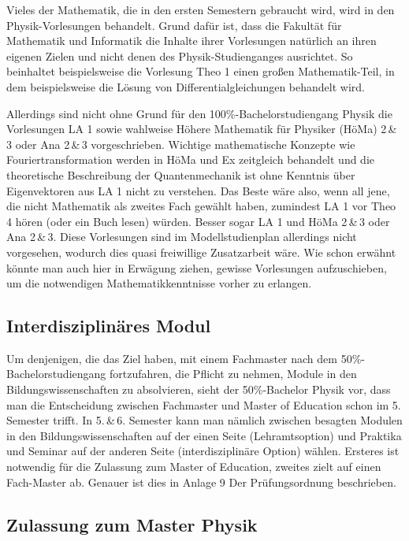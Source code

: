 Vieles der Mathematik, die in den ersten Semestern gebraucht wird, wird in den Physik-Vorlesungen behandelt. Grund dafür ist, dass die Fakultät für Mathematik und Informatik die Inhalte ihrer Vorlesungen natürlich an ihren eigenen Zielen und nicht denen des Physik-Studienganges ausrichtet. So beinhaltet beispielsweise die Vorlesung Theo 1 einen großen Mathematik-Teil, in dem beispielsweise die Lösung von Differentialgleichungen behandelt wird.

Allerdings sind nicht ohne Grund für den 100\%-Bachelorstudiengang Physik die Vorlesungen LA 1 sowie wahlweise Höhere Mathematik für Physiker (HöMa) 2\,\&\,3 oder Ana 2\,\&\,3 vorgeschrieben. Wichtige mathematische Konzepte wie Fouriertransformation werden in HöMa und Ex zeitgleich behandelt und die theoretische Beschreibung der Quantenmechanik ist ohne Kenntnis über Eigenvektoren aus LA 1 nicht zu verstehen. Das Beste wäre also, wenn all jene, die nicht Mathematik als zweites Fach gewählt haben, zumindest LA 1 vor Theo 4 hören (oder ein Buch lesen) würden. Besser sogar LA 1 und HöMa 2\,\&\,3 oder Ana 2\,\&\,3. Diese Vorlesungen sind im Modellstudienplan allerdings nicht vorgesehen, wodurch dies quasi freiwillige Zusatzarbeit wäre. Wie schon erwähnt könnte man auch hier in Erwägung ziehen, gewisse Vorlesungen aufzuschieben, um die notwendigen Mathematikkenntnisse vorher zu erlangen.


\subsection{Interdisziplinäres Modul}

Um denjenigen, die das Ziel haben, mit einem Fachmaster nach dem 50\%-Bachelorstudiengang fortzufahren, die Pflicht zu nehmen, Module in den Bildungswissenschaften zu absolvieren, sieht der 50\%-Bachelor Physik vor, dass man die Entscheidung zwischen Fachmaster und Master of Education schon im 5. Semester trifft. In 5.\,\&\,6. Semester kann man nämlich zwischen besagten Modulen in den Bildungswissenschaften auf der einen Seite (Lehramtsoption) und Praktika und Seminar auf der anderen Seite (interdisziplinäre Option) wählen. Ersteres ist notwendig für die Zulassung zum Master of Education, zweites zielt auf einen Fach-Master ab. Genauer ist dies in Anlage 9 Der Prüfungsordnung beschrieben.


\subsection{Zulassung zum Master Physik}

